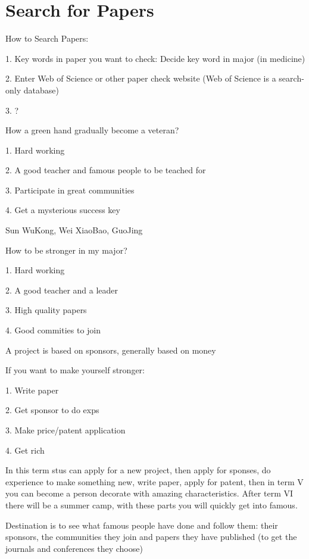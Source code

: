 \section{Search for Papers}%
\label{sec:Search for Papers}
How to Search Papers:

1. Key words in paper you want to check: Decide key word in major (in medicine)

2. Enter Web of Science or other paper check website (Web of Science is a search-only database)

3. ? 

\begin{notation}
    How a green hand gradually become a veteran?

    1. Hard working

    2. A good teacher and famous people to be teached for

    3. Participate in great communities
    
    4. Get a mysterious success key
    \begin{eg}
        Sun WuKong, Wei XiaoBao, GuoJing
    \end{eg}
\end{notation}
\begin{notation}
    How to be stronger in my major?

    1. Hard working

    2. A good teacher and a leader

    3. High quality papers

    4. Good commities to join
\end{notation}
\begin{notation}
    A project is based on sponsors, generally based on money
\end{notation}
\begin{notation}
    If you want to make yourself stronger:

    1. Write paper

    2. Get sponsor to do exps

    3. Make price/patent application

    4. Get rich
\end{notation}
In this term stus can apply for a new project, then apply for sponses, do experience to make something new, write paper, apply for patent, then in term V you can become a person decorate with amazing characteristics. After term VI there will be a summer camp, with these parts you will quickly get into famous.

    Destination is to see what famous people have done and follow them: their sponsors, the communities they join and papers they have published (to get the journals and conferences they choose)


